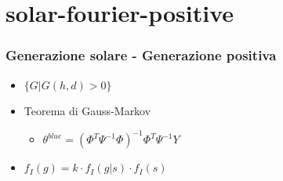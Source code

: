 \documentclass{beamer}
\begin{document}
\section{solar-fourier-positive}
\begin{frame}
    \frametitle{Generazione solare - Generazione positiva}   
    \begin{itemize}
        \item $\{G | G(h, d)>0\}$
        \vspace{0.2cm}
        \item Teorema di Gauss-Markov\begin{itemize}
             \vspace{0.2cm}
            \item $\theta^{blue}=(\Phi^T\Psi^{-1}\Phi)^{-1}\Phi^T\Psi^{-1}Y$
        \end{itemize}
        \item $f_I(g)=k\cdot f_I(g|s)\cdot f_I(s)$
        
    \end{itemize}
    
    \begin{overlayarea}{\textwidth}{\textheight}
        \vfill
        \centering
        

\end{overlayarea}
\end{frame}
\end{document}
